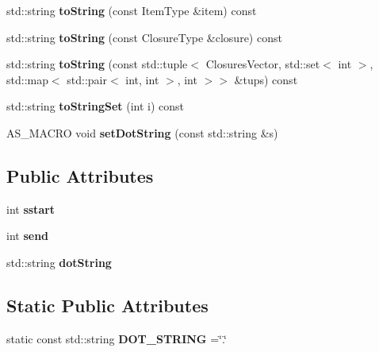 \begin{DoxyCompactItemize}
\mbox{\label{classx2_1_1_l_r_gramma_a0de96313ac9b29148dcf146fcae9af45}} 
std\+::string {\bfseries to\+String} (const Item\+Type \&item) const
\item 
\mbox{\label{classx2_1_1_l_r_gramma_a91003d63b709ba51c5d1759ec89d61f4}} 
std\+::string {\bfseries to\+String} (const Closure\+Type \&closure) const
\item 
\mbox{\label{classx2_1_1_l_r_gramma_a1a15ca465ccc7d3b77a5e8780f519fa1}} 
std\+::string {\bfseries to\+String} (const std\+::tuple$<$ Closures\+Vector, std\+::set$<$ int $>$, std\+::map$<$ std\+::pair$<$ int, int $>$, int $>$$>$ \&tups) const
\item 
\mbox{\label{classx2_1_1_l_r_gramma_acd4d44e2d8b4a0d06599431bae7bad86}} 
std\+::string {\bfseries to\+String\+Set} (int i) const
\item 
\mbox{\label{classx2_1_1_l_r_gramma_a66728cb47718f3041fb797ef2992a55e}} 
A\+S\+\_\+\+M\+A\+C\+RO void {\bfseries set\+Dot\+String} (const std\+::string \&s)
\end{DoxyCompactItemize}
\subsection*{Public Attributes}
\begin{DoxyCompactItemize}
\item 
\mbox{\label{classx2_1_1_l_r_gramma_adac4892cff5dc2a78380612d7bb31597}} 
int {\bfseries sstart}
\item 
\mbox{\label{classx2_1_1_l_r_gramma_a2e2226f01f334f7aec6f2a13c4e614f3}} 
int {\bfseries send}
\item 
\mbox{\label{classx2_1_1_l_r_gramma_a9a36e830070363ce6b50d36bef3efd88}} 
std\+::string {\bfseries dot\+String}
\end{DoxyCompactItemize}
\subsection*{Static Public Attributes}
\begin{DoxyCompactItemize}
\item 
\mbox{\label{classx2_1_1_l_r_gramma_a2349263521150b34859af413c5dbbc2c}} 
static const std\+::string {\bfseries D\+O\+T\+\_\+\+S\+T\+R\+I\+NG} =\char`\"{}.\char`\"{}
\end{DoxyCompactItemize}
